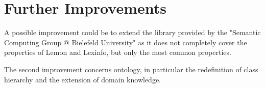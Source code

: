 \section{Further Improvements}
\label{sec:improvements}

A possible improvement could be to extend the library provided by the "Semantic Computing Group @ Bielefeld University" as it does not completely cover the properties of Lemon and Lexinfo, but only the most common properties. 

The second improvement concerns ontology, in particular the redefinition of class hierarchy and the extension of domain knowledge.